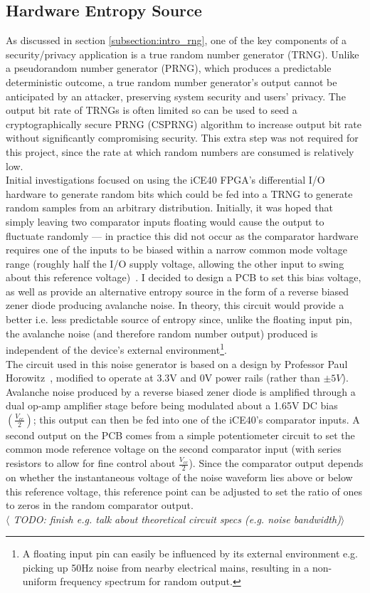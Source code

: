 \documentclass[12pt]{article}
\begin{document}
  \subsection{Hardware Entropy Source}
    As discussed in section \ref{subsection:intro_rng}, one of the key components of a security/privacy application is a true random number generator (TRNG). Unlike a pseudorandom number generator (PRNG), which produces a predictable deterministic outcome, a true random number generator's output cannot be anticipated by an attacker, preserving system security and users' privacy. The output bit rate of TRNGs is often limited so can be used to seed a cryptographically secure PRNG (CSPRNG) algorithm to increase output bit rate without significantly compromising security. This extra step was not required for this project, since the rate at which random numbers are consumed is relatively low.\\

    Initial investigations focused on using the iCE40 FPGA's differential I/O hardware to generate random bits which could be fed into a TRNG to generate random samples from an arbitrary distribution. Initially, it was hoped that simply leaving two comparator inputs floating would cause the output to fluctuate randomly --- in practice this did not occur as the comparator hardware requires one of the inputs to be biased within a narrow common mode voltage range (roughly half the I/O supply voltage, allowing the other input to swing about this reference voltage)~\cite{ice40_diff_io}. I decided to design a PCB to set this bias voltage, as well as provide an alternative entropy source in the form of a reverse biased zener diode producing avalanche noise. In theory, this circuit would provide a better i.e. less predictable source of entropy since, unlike the floating input pin, the avalanche noise (and therefore random number output) produced is independent of the device's external environment\footnote{A floating input pin can easily be influenced by its external environment e.g. picking up 50Hz noise from nearby electrical mains, resulting in a non-uniform frequency spectrum for random output.}.\\

    The circuit used in this noise generator is based on a design by Professor Paul Horowitz~\cite[p.~984]{art_of_electronics}, modified to operate at 3.3V and 0V power rails (rather than $\pm5V$). Avalanche noise produced by a reverse biased zener diode is amplified through a dual op-amp amplifier stage before being modulated about a 1.65V DC bias $\left(\frac{V_{cc}}{2}\right)$; this output can then be fed into one of the iCE40's comparator inputs. A second output on the PCB comes from a simple potentiometer circuit to set the common mode reference voltage on the second comparator input (with series resistors to allow for fine control about $\frac{V_{cc}}{2}$). Since the comparator output depends on whether the instantaneous voltage of the noise waveform lies above or below this reference voltage, this reference point can be adjusted to set the ratio of ones to zeros in the random comparator output.\\
    \textit{$\langle$ TODO: finish e.g. talk about theoretical circuit specs (e.g. noise bandwidth)$\rangle$}
\end{document}
